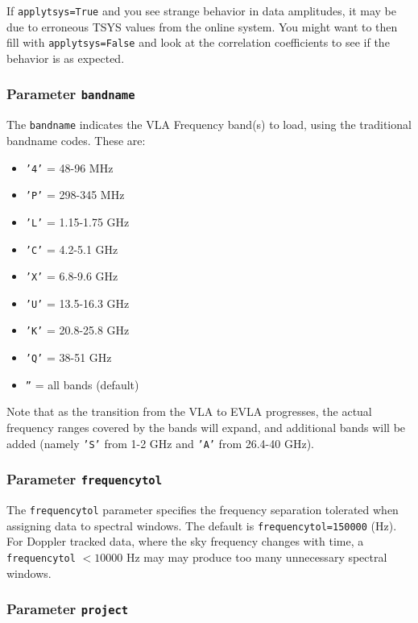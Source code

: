 If {\tt applytsys=True} and you see strange behavior in data
amplitudes, it may be due to erroneous TSYS values from the online
system.  You might want to then fill with {\tt applytsys=False} 
and look at the correlation coefficients to see if the behavior is
as expected.

\subsubsection{Parameter {\tt bandname} }
\label{section:io.import.vla.bandname}

The {\tt bandname} indicates the VLA Frequency band(s) to load,
using the traditional bandname codes.  These are:
\begin{itemize}
  \item {\tt '4'} =   48-96 MHz
  \item {\tt 'P'} =  298-345 MHz
  \item {\tt 'L'} = 1.15-1.75 GHz
  \item {\tt 'C'} =  4.2-5.1 GHz
  \item {\tt 'X'} =  6.8-9.6 GHz
  \item {\tt 'U'} = 13.5-16.3 GHz
  \item {\tt 'K'} = 20.8-25.8 GHz
  \item {\tt 'Q'} =   38-51 GHz
  \item {\tt ''}  = all bands (default)
\end{itemize}

Note that as the transition from the VLA to EVLA progresses,
the actual frequency ranges covered by the bands will expand,
and additional bands will be added (namely {\tt 'S'} from 1-2 GHz and 
{\tt 'A'} from 26.4-40 GHz).

\subsubsection{Parameter {\tt frequencytol} }
\label{section:io.import.vla.frequencytol}

The {\tt frequencytol} parameter specifies the frequency separation
tolerated when assigning data to spectral windows.  The
default is {\tt frequencytol=150000} (Hz).  
For Doppler tracked data, where the sky frequency changes with time,
a {\tt frequencytol} $< 10000$ Hz may may produce too many
unnecessary spectral windows.

\subsubsection{Parameter {\tt project} }
\label{section:io.import.vla.project}


